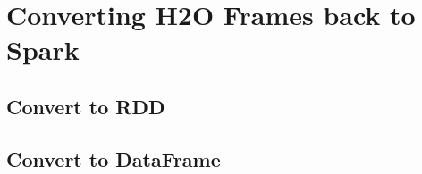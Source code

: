 \documentclass{standalone}
\begin{document}
	\section{Converting H2O Frames back to Spark}

	\subsection{Convert to RDD}
	\subsection{Convert to DataFrame}
\end{document}
